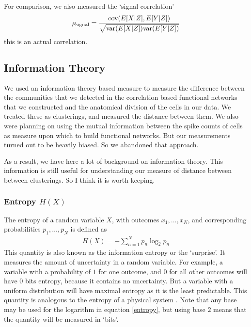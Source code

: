         For comparison, we also measured the `signal correlation'
        \begin{align}\label{eq:signal_correlation}
            \rho_{\text{signal}} = \frac{\text{cov}(E[X|Z], E[Y|Z])}{\sqrt{\text{var}(E[X|Z])\text{var}(E[Y|Z])}}
        \end{align}
        this is an actual correlation.

    \subsection{Information Theory}\label{sec:information_theory}
    We used an information theory based measure to measure the difference between the communities that we detected in the correlation based functional networks that we constructed and the anatomical division of the cells in our data. We treated these as clusterings, and measured the distance between them. We also were planning on using the mutual information between the spike counts of cells as measure upon which to build functional networks. But our measurements turned out to be heavily biased. So we abandoned that approach.

    As a result, we have here a lot of background on information theory. This information is still useful for understanding our measure of distance between between clusterings. So I think it is worth keeping.

        \subsubsection{Entropy $H(X)$}
        The entropy of a random variable $X$, with outcomes $x_1, \dots, x_N$, and corresponding probabilities $p_1, \dots, p_N$ is defined as
        \begin{align}\label{entropy}
        H(X) = -\sum_{n=1}^N p_n \log _2 p_n
        \end{align}
        This quantity is also known as the information entropy or the `surprise'. It measures the amount of uncertainty in a random variable. For example, a variable with a probability of $1$ for one outcome, and $0$ for all other outcomes will have 0 bits entropy, because it contains no uncertainty. But a variable with a uniform distribution will have maximal entropy as it is the least predictable. This quantity is analogous to the entropy of a physical system  \parencite{shannon}. Note that any base may be used for the logarithm in equation \ref{entropy}, but using base $2$ means that the quantity will be measured in `bits'.

